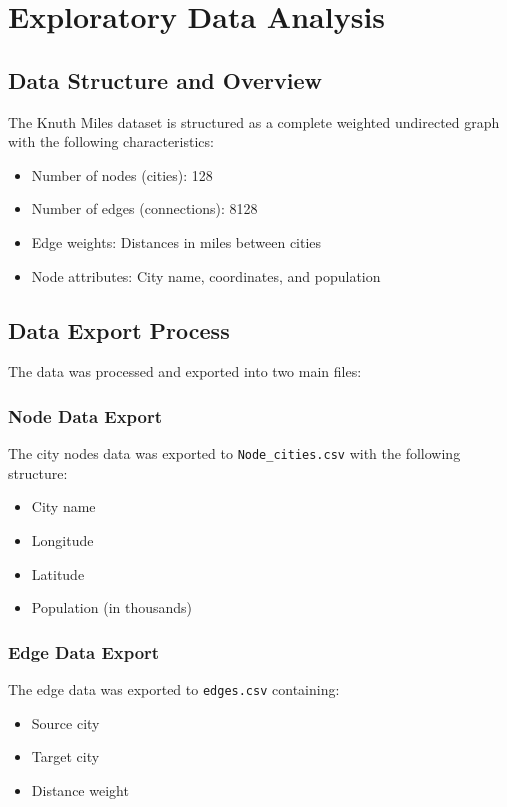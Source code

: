 \chapter{Exploratory Data Analysis}

\section{Data Structure and Overview}
The Knuth Miles dataset is structured as a complete weighted undirected graph with the following characteristics:
\begin{itemize}
    \item Number of nodes (cities): 128
    \item Number of edges (connections): 8128
    \item Edge weights: Distances in miles between cities
    \item Node attributes: City name, coordinates, and population
\end{itemize}

\section{Data Export Process}
The data was processed and exported into two main files:

\subsection{Node Data Export}
The city nodes data was exported to \texttt{Node\_cities.csv} with the following structure:
\begin{itemize}
    \item City name
    \item Longitude
    \item Latitude
    \item Population (in thousands)
\end{itemize}

\subsection{Edge Data Export}
The edge data was exported to \texttt{edges.csv} containing:
\begin{itemize}
    \item Source city
    \item Target city
    \item Distance weight
\end{itemize}

